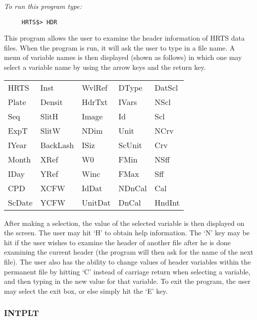 {\em To run this program type:}
\begin{verbatim}
     HRTS$> HDR
\end{verbatim}
  This program allows the user to examine the header information of
  HRTS data files.  When the program is run, it will ask the user to type
  in a file name.  A menu of variable names is then displayed (shown as
  follows) in which one may select a variable name by using the arrow
  keys and the return key.
\begin{center}
\begin{tabular}{||l l l l l ||}
\hline


           HRTS   &     Inst  &     WvlRef  &    DType  &     DatScl \\
           Plate  &    Densit &     HdrTxt  &    IVars  &     NScl   \\
           Seq    &    SlitH  &      Image  &      Id   &     Scl    \\
           ExpT   &    SlitW  &      NDim   &     Unit  &     NCrv   \\
           IYear  &  BackLash &      ISiz   &    ScUnit &     Crv    \\
           Month  &     XRef  &       W0    &     FMin  &     NSff   \\
           IDay   &     YRef  &      Winc   &     FMax  &     Sff    \\
           CPD    &     XCFW  &      IdDat  &    NDnCal &     Cal    \\
           ScDate &      YCFW &    UnitDat  &     DnCal &    HndInt  \\
\hline
\end{tabular}
\end{center}
   After making a selection, the value of the selected variable is then
   displayed on the screen.  The user may hit `H' to obtain help
   information.  The `N' key may be hit if the user wishes to examine the
   header of another file after he is done examining the current header
  (the program will then ask for the name of the next file).  The user
   also has the ability to change values of header variables within the
   permanent file by hitting `C' instead of carriage return when selecting
   a variable, and then typing in the new value for that variable.  To
   exit the program, the user may select the exit box, or else simply hit
   the `E' key.

\subsubsection{INTPLT}

